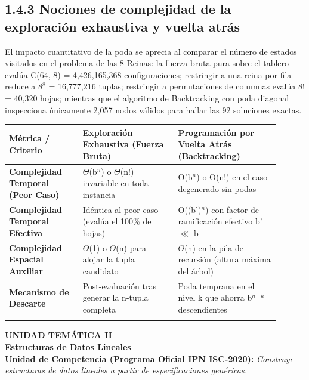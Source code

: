 \documentclass[11pt,letterpaper]{article}
\begin{document}
\subsection*{1.4.3 Nociones de complejidad de la exploración exhaustiva y vuelta atrás}
El impacto cuantitativo de la poda se aprecia al comparar el número de estados visitados en el problema de las 8-Reinas: la fuerza bruta pura sobre el tablero evalúa C(64, 8) = 4,426,165,368 configuraciones; restringir a una reina por fila reduce a 8$^8$ = 16,777,216 tuplas; restringir a permutaciones de columnas evalúa 8! = 40,320 hojas; mientras que el algoritmo de Backtracking con poda diagonal inspecciona únicamente 2,057 nodos válidos para hallar las 92 soluciones exactas.\par
\vspace{4pt}\noindent
\begin{tabular}{>{\raggedright\arraybackslash}p{0.249\linewidth}>{\raggedright\arraybackslash}p{0.318\linewidth}>{\raggedright\arraybackslash}p{0.332\linewidth}}
\toprule
\textbf{\color{ipnguinda}Métrica / Criterio} & \textbf{\color{ipnguinda}Exploración Exhaustiva (Fuerza Bruta)} & \textbf{\color{ipnguinda}Programación por Vuelta Atrás (Backtracking)} \\
\midrule
\textbf{Complejidad Temporal (Peor Caso)} & $\Theta$(b$^n$) o $\Theta$(n!) invariable en toda instancia & O(b$^n$) o O(n!) en el caso degenerado sin podas \\
\addlinespace[3pt]
\textbf{Complejidad Temporal Efectiva} & Idéntica al peor caso (evalúa el 100\% de hojas) & O((b')$^n$) con factor de ramificación efectivo b' $\ll$ b \\
\addlinespace[3pt]
\textbf{Complejidad Espacial Auxiliar} & $\Theta$(1) o $\Theta$(n) para alojar la tupla candidato & $\Theta$(n) en la pila de recursión (altura máxima del árbol) \\
\addlinespace[3pt]
\textbf{Mecanismo de Descarte} & Post-evaluación tras generar la n-tupla completa & Poda temprana en el nivel k que ahorra b$^n$$^-$$^k$ descendientes \\
\addlinespace[3pt]
\bottomrule
\end{tabular}
\vspace{6pt}\par
\newpage
\noindent\colorbox{ipnguinda!10}{\parbox{\dimexpr\linewidth-2\fboxsep\relax}{\vspace{6pt}\textbf{\color{ipnblue}\small UNIDAD TEMÁTICA II}\\[4pt]\textbf{\color{ipnguinda}\LARGE Estructuras de Datos Lineales}\\[6pt]\textbf{\color{ipnblue}Unidad de Competencia (Programa Oficial IPN ISC-2020):} \textit{Construye estructuras de datos lineales a partir de especificaciones genéricas.}\vspace{6pt}}}\vspace{10pt}
\end{document}
